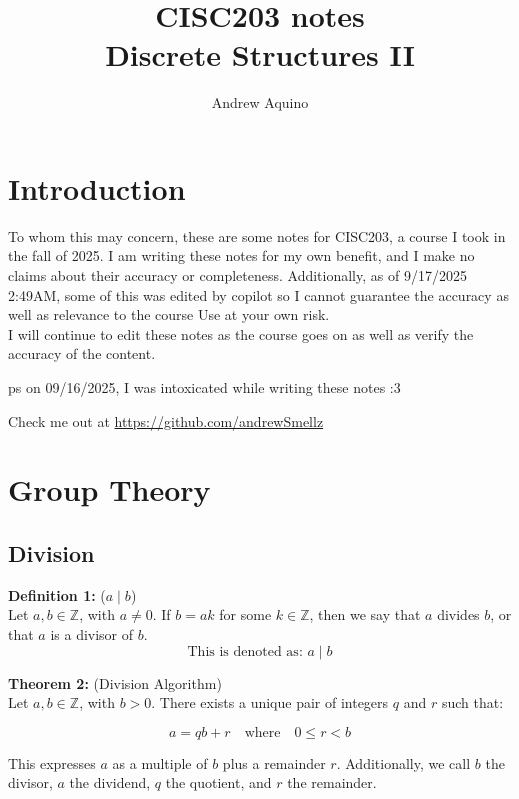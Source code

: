 \documentclass[12pt]{article}
\title{CISC203 notes\\Discrete Structures II}
\author{Andrew Aquino}
\date{}
\begin{document}
\maketitle

\section*{Introduction}

To whom this may concern, these are some notes for CISC203, 
a course I took in the fall of 2025. 
I am writing these notes for my own benefit, 
and I make no claims about their accuracy or completeness. 
Additionally, as of 9/17/2025 2:49AM, some of this was edited by copilot so I cannot guarantee the accuracy as well as relevance to the course
Use at your own risk.
\\
I will continue to edit these notes as the course goes on as well as verify the accuracy of the content.


ps on 09/16/2025, I was intoxicated while writing these notes :3

Check me out at \url{https://github.com/andrewSmellz}

\tableofcontents
\newpage

\section{Group Theory}

\subsection{Division}

\noindent\textbf{Definition 1:} ($a \mid b$) 
\label{def:divides}
\\Let $a, b \in \mathbb{Z}$, with $a \neq 0$.  
If $b = ak$ for some $k \in \mathbb{Z}$, then we say that $a$ divides $b$,  
or that $a$ is a divisor of $b$. 
\[\text{This is denoted as: } a \mid b\]

\vspace{5mm}

\noindent\textbf{Theorem 2:} (Division Algorithm) 
\label{thm:division}
\\Let $a, b \in \mathbb{Z}$, with $b > 0$.  
There exists a unique pair of integers $q$ and $r$ such that:

\[
a = qb + r \quad \text{where} \quad 0 \leq r < b
\]

\noindent This expresses $a$ as a multiple of $b$ plus a remainder $r$.
Additionally, we call $b$ the divisor, $a$ the dividend, $q$ the quotient, and $r$ the remainder.
\end{document}
